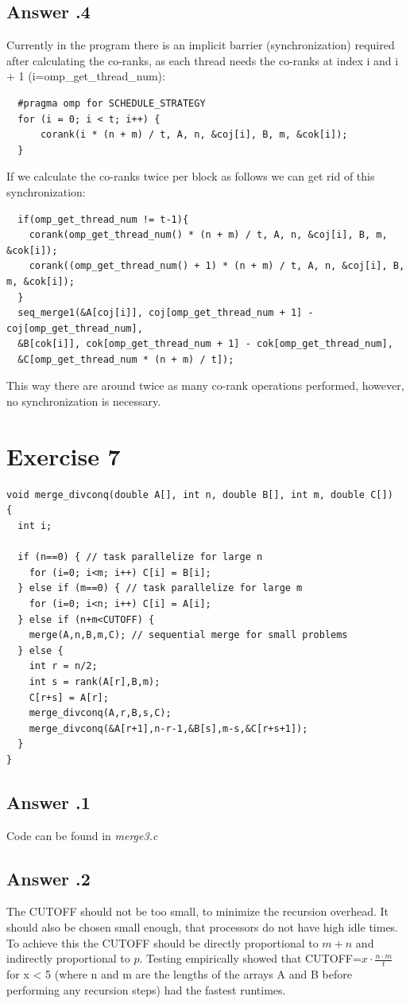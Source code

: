 \documentclass[a4paper,%
11pt,%
DIV=12,
headsepline,%
headings=normal,
]{scrartcl}
\newcounter{curex}
\newcommand{\exercise}[1]{\section*{Exercise #1}\setcounter{curex}{#1}}
\newcommand{\answer}[1]{\subsection*{Answer \arabic{curex}.#1}}
\begin{document}
\answer{4}
Currently in the program there is an implicit barrier (synchronization) required after calculating the co-ranks, as each thread needs the co-ranks at index i and i + 1 (i=omp\_get\_thread\_num):\\
  \begin{minipage}[t]{1.0\linewidth}
\begin{lstlisting}
  #pragma omp for SCHEDULE_STRATEGY
  for (i = 0; i < t; i++) {
      corank(i * (n + m) / t, A, n, &coj[i], B, m, &cok[i]);
  }
  \end{lstlisting}
\end{minipage}
If we calculate the co-ranks twice per block as follows we can get rid of this synchronization:
  \begin{minipage}[t]{1.0\linewidth}
\begin{lstlisting}
  if(omp_get_thread_num != t-1){
    corank(omp_get_thread_num() * (n + m) / t, A, n, &coj[i], B, m, &cok[i]);
    corank((omp_get_thread_num() + 1) * (n + m) / t, A, n, &coj[i], B, m, &cok[i]);
  }
  seq_merge1(&A[coj[i]], coj[omp_get_thread_num + 1] - coj[omp_get_thread_num], 
  &B[cok[i]], cok[omp_get_thread_num + 1] - cok[omp_get_thread_num], 
  &C[omp_get_thread_num * (n + m) / t]);
  \end{lstlisting}
\end{minipage}
This way there are around twice as many co-rank operations performed, however, no synchronization is necessary.

\exercise{7}

\begin{minipage}[t]{1.0\linewidth}
\begin{lstlisting}
void merge_divconq(double A[], int n, double B[], int m, double C[])
{
  int i;

  if (n==0) { // task parallelize for large n
    for (i=0; i<m; i++) C[i] = B[i];
  } else if (m==0) { // task parallelize for large m
    for (i=0; i<n; i++) C[i] = A[i];
  } else if (n+m<CUTOFF) {
    merge(A,n,B,m,C); // sequential merge for small problems
  } else {
    int r = n/2;
    int s = rank(A[r],B,m);
    C[r+s] = A[r];
    merge_divconq(A,r,B,s,C);
    merge_divconq(&A[r+1],n-r-1,&B[s],m-s,&C[r+s+1]);
  }
}
\end{lstlisting}
\end{minipage}

\answer{1}
Code can be found in \textit{merge3.c}
\answer{2}
The CUTOFF should not be too small, to minimize the recursion overhead. It should also be chosen small enough, that processors do not have high idle times. To achieve this the CUTOFF should be directly proportional to $m+n$ and indirectly proportional to $p$. Testing empirically showed that CUTOFF=$ x\cdot \frac{n \cdot m}{t}$ for x < 5 (where n and m are the lengths of the arrays A and B before performing any recursion steps) had the fastest runtimes.
\end{document}
